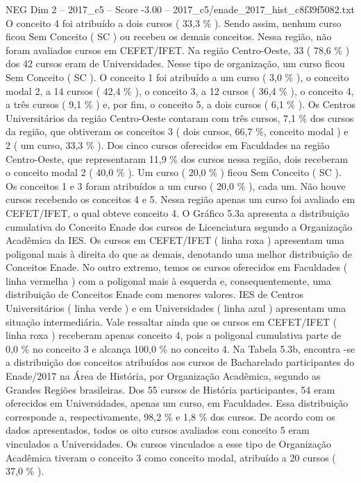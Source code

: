 \begin{textsample}{NEG Dim 2 – 2017\_c5 – Score -3.00 – 2017\_c5/enade\_2017\_hist\_c8f39f5082.txt}
O conceito 4 foi atribuído a dois cursos ( 33,3 \% ).
Sendo assim, nenhum curso ficou Sem Conceito ( SC ) ou recebeu os demais conceitos.
Nessa região, não foram avaliados cursos em CEFET/IFET.
Na região Centro-Oeste, 33 ( 78,6 \% ) dos 42 cursos eram de Universidades.
Nesse tipo de organização, um curso ficou Sem Conceito ( SC ).
O conceito 1 foi atribuído a um curso ( 3,0 \% ), o conceito modal 2, a 14 cursos ( 42,4 \% ), o conceito 3, a 12 cursos ( 36,4 \% ), o conceito 4, a três cursos ( 9,1 \% ) e, por fim, o conceito 5, a dois cursos ( 6,1 \% ).
Os Centros Universitários da região Centro-Oeste contaram com três cursos, 7,1 \% dos cursos da região, que obtiveram os conceitos 3 ( dois cursos, 66,7 \%, conceito modal ) e 2 ( um curso, 33,3 \% ).
Dos cinco cursos oferecidos em Faculdades na região Centro-Oeste, que representaram 11,9 \% dos cursos nessa região, dois receberam o conceito modal 2 ( 40,0 \% ).
Um curso ( 20,0 \% ) ficou Sem Conceito ( SC ).
Os conceitos 1 e 3 foram atribuídos a um curso ( 20,0 \% ), cada um.
Não houve cursos recebendo os conceitos 4 e 5.
Nessa região apenas um curso foi avaliado em CEFET/IFET, o qual obteve conceito 4.
O Gráfico 5.3a apresenta a distribuição cumulativa do Conceito Enade dos cursos de Licenciatura segundo a Organização Acadêmica da IES.
Os cursos em CEFET/IFET ( linha roxa ) apresentam uma poligonal mais à direita do que as demais, denotando uma melhor distribuição de Conceitos Enade.
No outro extremo, temos os cursos oferecidos em Faculdades ( linha vermelha ) com a poligonal mais à esquerda e, consequentemente, uma distribuição de Conceitos Enade com menores valores.
IES de Centros Universitários ( linha verde ) e em Universidades ( linha azul ) apresentam uma situação intermediária.
Vale ressaltar ainda que os cursos em CEFET/IFET ( linha roxa ) receberam apenas conceito 4, pois a poligonal cumulativa parte de 0,0 \% no conceito 3 e alcança 100,0 \% no conceito 4.
Na Tabela 5.3b, encontra -se a distribuição dos conceitos atribuídos aos cursos de Bacharelado participantes do Enade/2017 na Área de História, por Organização Acadêmica, segundo as Grandes Regiões brasileiras.
Dos 55 cursos de História participantes, 54 eram oferecidos em Universidades, apenas um curso, em Faculdades.
Essa distribuição corresponde a, respectivamente, 98,2 \% e 1,8 \% dos cursos.
De acordo com os dados apresentados, todos os oito cursos avaliados com conceito 5 eram vinculados a Universidades.
Os cursos vinculados a esse tipo de Organização Acadêmica tiveram o conceito 3 como conceito modal, atribuído a 20 cursos ( 37,0 \% ).

\end{textsample}
